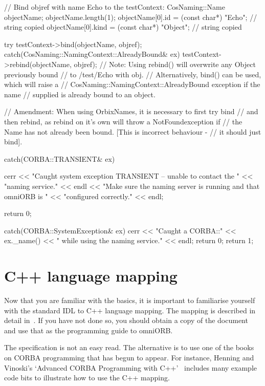 \documentclass[11pt,twoside,a4paper]{book}
\begin{document}
\begin{cxxlisting}
{{    // Bind objref with name Echo to the testContext:
    CosNaming::Name objectName;
    objectName.length(1);
    objectName[0].id   = (const char*) "Echo";   // string copied
    objectName[0].kind = (const char*) "Object"; // string copied

    try {
      testContext->bind(objectName, objref);
    }
    catch(CosNaming::NamingContext::AlreadyBound& ex) {
      testContext->rebind(objectName, objref);
    }
    // Note: Using rebind() will overwrite any Object previously bound
    //       to /test/Echo with obj.
    //       Alternatively, bind() can be used, which will raise a
    //       CosNaming::NamingContext::AlreadyBound exception if the name
    //       supplied is already bound to an object.

    // Amendment: When using OrbixNames, it is necessary to first try bind
    // and then rebind, as rebind on it's own will throw a NotFoundexception if
    // the Name has not already been bound. [This is incorrect behaviour -
    // it should just bind].
  }
  catch(CORBA::TRANSIENT& ex) {
    cerr << "Caught system exception TRANSIENT -- unable to contact the "
         << "naming service." << endl
	 << "Make sure the naming server is running and that omniORB is "
	 << "configured correctly." << endl;

    return 0;
  }
  catch(CORBA::SystemException& ex) {
    cerr << "Caught a CORBA::" << ex._name()
	 << " while using the naming service." << endl;
    return 0;
  }
  return 1;
}
\end{cxxlisting}





\chapter{C++ language mapping}

Now that you are familiar with the basics, it is important to
familiarise yourself with the standard IDL to C++ language mapping.
The mapping is described in detail in~\cite{cxxmapping}. If you have
not done so, you should obtain a copy of the document and use that as
the programming guide to omniORB.

The specification is not an easy read. The alternative is to use one
of the books on CORBA programming that has begun to appear. For
instance, Henning and Vinoski's `Advanced CORBA Programming with
C++'~\cite{henning1999} includes many example code bits to illustrate
how to use the C++ mapping.
\end{document}
